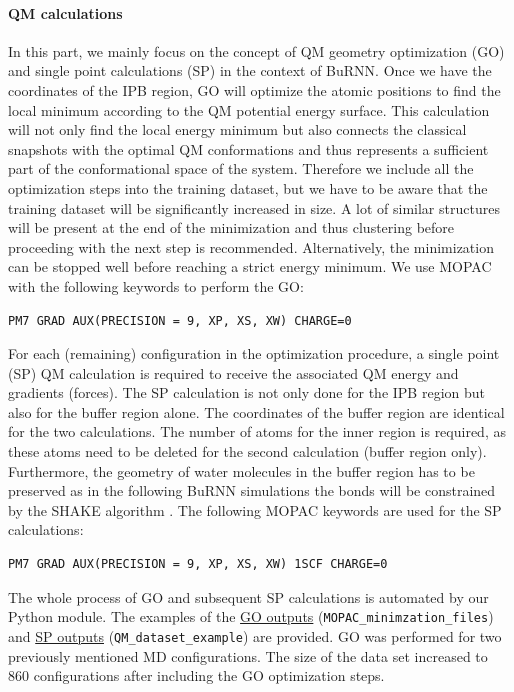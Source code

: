 \paragraph{QM calculations}
In this part, we mainly focus on the concept of QM geometry optimization (GO) and single point calculations (SP) in the context of BuRNN. Once we have the coordinates of the IPB region, GO will optimize the atomic positions to find the local minimum according to the QM potential energy surface. This calculation will not only find the local energy minimum but also connects the classical snapshots with the optimal QM conformations and thus represents a sufficient part of the conformational space of the system. Therefore we include all the optimization steps into the training dataset, but we have to be aware that the training dataset will be significantly increased in size. A lot of similar structures will be present at the end of the minimization and thus clustering before proceeding with the next step is recommended. Alternatively, the minimization can be stopped well before reaching a strict energy minimum. We use MOPAC with the following keywords to perform the GO:

\begin{lstlisting}[breaklines=true, breakatwhitespace=false]
PM7 GRAD AUX(PRECISION = 9, XP, XS, XW) CHARGE=0
\end{lstlisting}

For each (remaining) configuration in the optimization procedure, a single point (SP) QM calculation is required to receive the associated QM energy and gradients (forces). The SP calculation is not only done for the IPB region but also for the buffer region alone. The coordinates of the buffer region are identical for the two calculations. The number of atoms for the inner region is required, as these atoms need to be deleted for the second calculation (buffer region only). Furthermore, the geometry of water molecules in the buffer region has to be preserved as in the following BuRNN simulations the bonds will be constrained by the SHAKE algorithm \cite{RYCKAERT1977SHAKE}. The following MOPAC keywords are used for the SP calculations:

\begin{lstlisting}[breaklines=true, breakatwhitespace=false]
PM7 GRAD AUX(PRECISION = 9, XP, XS, XW) 1SCF CHARGE=0
\end{lstlisting}


The whole process of GO and subsequent SP calculations is automated by our Python module. The examples of the \href{https://github.com/LierB/gromos_tutorial_livecoms/tree/burnn_tutorial_rc/tutorial_files/t_06/train_dataset_tutorial/MOPAC_minimzation_files}{GO outputs} (\texttt{MOPAC\_minimzation\_files}) and \href{https://github.com/LierB/gromos_tutorial_livecoms/tree/burnn_tutorial_rc/tutorial_files/t_06/train_dataset_tutorial/QM_dataset_example}{SP outputs} (\texttt{QM\_dataset\_example}) are provided. GO was performed for two previously mentioned MD configurations. The size of the data set increased to 860 configurations after including the GO optimization steps.



